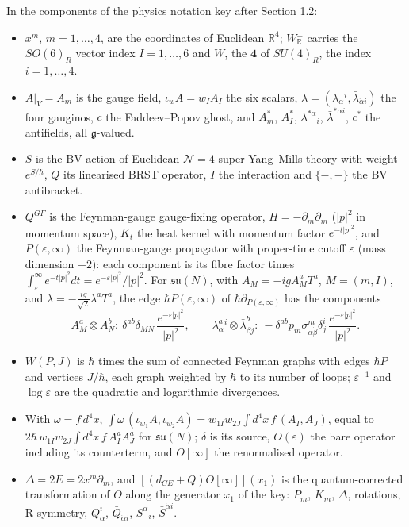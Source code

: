 \begin{remark}
In the components of the physics notation key after Section 1.2:
\begin{itemize}
\item $x^m$, $m=1,\dots,4$, are the coordinates of Euclidean $\mathbb R^4$; $W_{\mathbb R}^\perp$ carries the $SO(6)_R$ vector index $I=1,\dots,6$ and $W$, the $\mathbf 4$ of $SU(4)_R$, the index $i=1,\dots,4$.
\item $A|_V=A_m$ is the gauge field, $\iota_wA=w_IA_I$ the six scalars, $\lambda=(\lambda_\alpha{}^i,\bar\lambda_{\dot\alpha i})$ the four gauginos, $c$ the Faddeev--Popov ghost, and $A^*_m$, $A^*_I$, $\lambda^{*\alpha}{}_i$, $\bar\lambda^{*\dot\alpha i}$, $c^*$ the antifields, all $\mathfrak g$-valued.
\item $S$ is the BV action of Euclidean $\mathcal N=4$ super Yang--Mills theory with weight $e^{S/\hbar}$, $Q$ its linearised BRST operator, $I$ the interaction and $\{-,-\}$ the BV antibracket.
\item $Q^{GF}$ is the Feynman-gauge gauge-fixing operator, $H=-\partial_m\partial_m$ ($|p|^2$ in momentum space), $K_t$ the heat kernel with momentum factor $e^{-t|p|^2}$, and $P(\varepsilon,\infty)$ the Feynman-gauge propagator with proper-time cutoff $\varepsilon$ (mass dimension $-2$): each component is its fibre factor times $\int_\varepsilon^\infty e^{-t|p|^2}dt=e^{-\varepsilon|p|^2}/|p|^2$. For $\mathfrak{su}(N)$, with $A_M=-igA^a_MT^a$, $M=(m,I)$, and $\lambda=-\tfrac{ig}{\sqrt2}\lambda^aT^a$, the edge $\hbar P(\varepsilon,\infty)$ of $\hbar\partial_{P(\varepsilon,\infty)}$ has the components
\[
A^a_M\otimes A^b_N:\ \delta^{ab}\delta_{MN}\,\frac{e^{-\varepsilon|p|^2}}{|p|^2},\qquad \lambda^a_\alpha{}^i\otimes\bar\lambda^b_{\dot\beta j}:\ -\delta^{ab}p_m\sigma^m_{\alpha\dot\beta}\delta^i_j\,\frac{e^{-\varepsilon|p|^2}}{|p|^2}.
\]
\item $W(P,J)$ is $\hbar$ times the sum of connected Feynman graphs with edges $\hbar P$ and vertices $J/\hbar$, each graph weighted by $\hbar$ to its number of loops; $\varepsilon^{-1}$ and $\log\varepsilon$ are the quadratic and logarithmic divergences.
\item With $\omega=f\,d^4x$, $\int\omega\,(\iota_{w_1}A,\iota_{w_2}A)=w_{1I}w_{2J}\int d^4x\,f\,(A_I,A_J)$, equal to $2\hbar\,w_{1I}w_{2J}\int d^4x\,f\,A^a_IA^a_J$ for $\mathfrak{su}(N)$; $\delta$ is its source, $O(\varepsilon)$ the bare operator including its counterterm, and $O[\infty]$ the renormalised operator.
\item $\Delta=2E=2x^m\partial_m$, and $[(d_{CE}+Q)O[\infty]](x_1)$ is the quantum-corrected transformation of $O$ along the generator $x_1$ of the key: $P_m$, $K_m$, $\Delta$, rotations, R-symmetry, $Q^i_\alpha$, $\bar Q_{\dot\alpha i}$, $S^\alpha{}_i$, $\bar S^{\dot\alpha i}$.
\end{itemize}
\end{remark}

